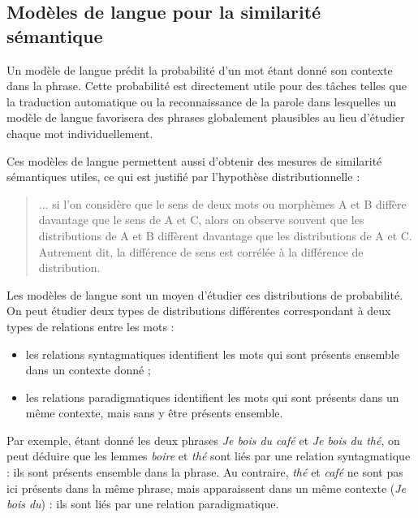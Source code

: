 \subsection{Modèles de langue pour la similarité sémantique}
\label{subsec:modeles_de_langue}

Un modèle de langue prédit la probabilité d'un mot étant donné son contexte
dans la phrase. Cette probabilité est directement utile pour des tâches telles
que la traduction automatique ou la reconnaissance de la parole dans lesquelles
un modèle de langue favorisera des phrases globalement plausibles au lieu
d'étudier chaque mot individuellement.

Ces modèles de langue permettent aussi d'obtenir des mesures de similarité
sémantiques utiles, ce qui est justifié par l'hypothèse distributionnelle
\cite[p.~786]{harris1954distributional} :

\begin{quote} ... si l'on considère que le sens de deux mots ou morphèmes A et B
    diffère davantage que le sens de A et C, alors on observe souvent que les
    distributions de A et B diffèrent davantage que les distributions de A et C.
    Autrement dit, la différence de sens est corrélée à la différence de
    distribution. \end{quote}

Les modèles de langue sont un moyen d'étudier ces distributions de probabilité.
On peut étudier deux types de distributions différentes correspondant à deux
types de relations entre les mots \citep{sahlgren2008distributional} :

\begin{itemize}
    \item les relations syntagmatiques identifient les mots qui sont présents
        ensemble dans un contexte donné ;
    \item les relations paradigmatiques identifient les mots qui sont présents
        dans un même contexte, mais sans y être présents ensemble.
\end{itemize}

Par exemple, étant donné les deux phrases \emph{Je bois du café} et \emph{Je
bois du thé}, on peut déduire que les lemmes \emph{boire} et \emph{thé} sont
liés par une relation syntagmatique : ils sont présents ensemble dans la
phrase. Au contraire, \emph{thé} et \emph{café} ne sont pas ici présents dans
la même phrase, mais apparaissent dans un même contexte (\emph{Je bois du}) :
ils sont liés par une relation paradigmatique.


